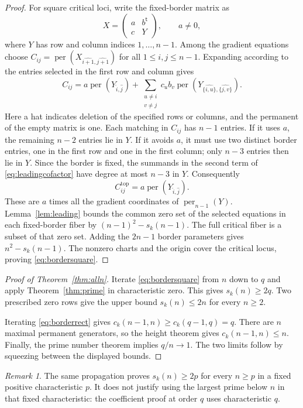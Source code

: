 \documentclass[11pt]{article}
\theoremstyle{definition}\newtheorem{definition}[theorem]{Definition}
\theoremstyle{remark}\newtheorem{remark}[theorem]{Remark}
\DeclareMathOperator{\per}{per}
\numberwithin{equation}{section}
\begin{document}
\begin{proof}
For square critical loci, write the fixed-border matrix as
\[
 X=\begin{pmatrix}a&b^{\mathsf t}\\ c&Y\end{pmatrix},
 \qquad a\ne0,
\]
where $Y$ has row and column indices $1,\ldots,n-1$. Among the
gradient equations choose
$C_{ij}=\per(X_{\widehat{i+1},\widehat{j+1}})$ for all
$1\le i,j\le n-1$. Expanding according to the entries selected
in the first row and column gives
\begin{equation}\label{eq:leadingcofactor}
 C_{ij}=a\per(Y_{\widehat i,\widehat j})
 +\sum_{\substack{u\ne i\\v\ne j}}c_u b_v
       \per(Y_{\widehat{\{i,u\}},\widehat{\{j,v\}}}).
\end{equation}
Here a hat indicates deletion of the specified rows or columns,
and the permanent of the empty matrix is one. Each matching in
$C_{ij}$ has $n-1$ entries. If it uses $a$, the remaining $n-2$
entries lie in $Y$. If it avoids $a$, it must use two distinct
border entries, one in the first row and one in the first column;
only $n-3$ entries then lie in $Y$. Since the border is fixed,
the summands in the second term of \eqref{eq:leadingcofactor}
have degree at most $n-3$ in $Y$. Consequently
\[
 C_{ij}^{\mathrm{top}}
   =a\per(Y_{\widehat i,\widehat j}).
\]
These are $a$ times all the gradient coordinates of $\per_{n-1}(Y)$.
Lemma~\ref{lem:leading} bounds the common zero set of the selected
equations in each fixed-border fiber by
$(n-1)^2-s_k(n-1)$. The full critical fiber is a subset of that
zero set. Adding the $2n-1$ border parameters gives
$n^2-s_k(n-1)$. The nonzero charts and the origin cover the
critical locus, proving \eqref{eq:bordersquare}.
\end{proof}

\begin{proof}[Proof of Theorem~\ref{thm:alln}]
Iterate \eqref{eq:bordersquare} from $n$ down to $q$ and apply
Theorem~\ref{thm:prime} in characteristic zero. This gives
$s_k(n)\ge2q$. Two prescribed zero rows give the upper bound
$s_k(n)\le2n$ for every $n\ge2$.

Iterating \eqref{eq:borderrect} gives
$c_k(n-1,n)\ge c_k(q-1,q)=q$. There are $n$ maximal permanent
generators, so the height theorem gives $c_k(n-1,n)\le n$.
Finally, the prime number theorem implies $q/n\to1$. The two
limits follow by squeezing between the displayed bounds.
\end{proof}

\begin{remark}
The same propagation proves $s_k(n)\ge2p$ for every $n\ge p$
in a fixed positive characteristic $p$. It does not justify
using the largest prime below $n$ in that fixed characteristic:
the coefficient proof at order $q$ uses characteristic $q$.
\end{remark}
\end{document}

